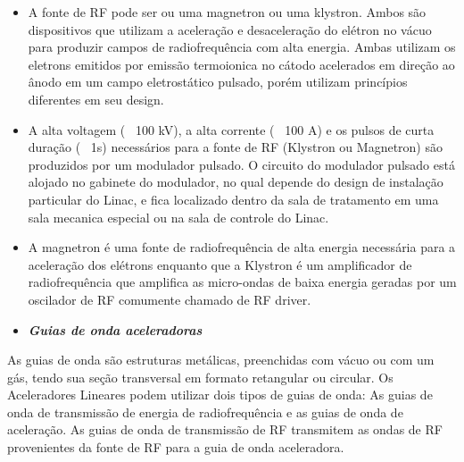 \documentclass[11pt,a4paper]{article}
\begin{document}
                    \begin{itemize}
                        \item A fonte de RF pode ser ou uma magnetron ou uma klystron. Ambos são dispositivos que utilizam a aceleração e desaceleração do elétron no vácuo para produzir campos de radiofrequência com alta energia. Ambas utilizam os eletrons emitidos por emissão termoionica no cátodo acelerados em direção ao ânodo em um campo eletrostático pulsado, porém utilizam princípios diferentes em seu design.
                        \item A alta voltagem (~ 100 kV), a alta corrente (~ 100 A) e os pulsos de curta duração ( ~1s) necessários para a fonte de RF (Klystron ou Magnetron) são produzidos por um modulador pulsado. O circuito do modulador pulsado está alojado no gabinete do modulador, no qual depende do design de instalação particular do Linac, e fica localizado dentro da sala de tratamento em uma sala mecanica especial ou na sala de controle do Linac.
                        \item A magnetron é uma fonte de radiofrequência de alta energia necessária para a aceleração dos elétrons enquanto que a Klystron é um amplificador de radiofrequência que amplifica as micro-ondas de baixa energia geradas por um oscilador de RF comumente chamado de RF driver. 
                    \end{itemize}

                
                \begin{itemize}
                    \item \textbf{\textit{\textcolor{CarnationPink}{Guias de onda aceleradoras}}}
                \end{itemize}
                 
                    As guias de onda são estruturas metálicas, preenchidas com vácuo ou com um gás, tendo sua seção transversal em formato retangular ou circular. Os Aceleradores Lineares podem utilizar dois tipos de guias de onda: As guias de onda de transmissão de energia de radiofrequência e as guias de onda de aceleração.  As guias de onda de transmissão de RF transmitem as ondas de RF provenientes da fonte de RF para a guia de onda aceleradora. 
\end{document}
